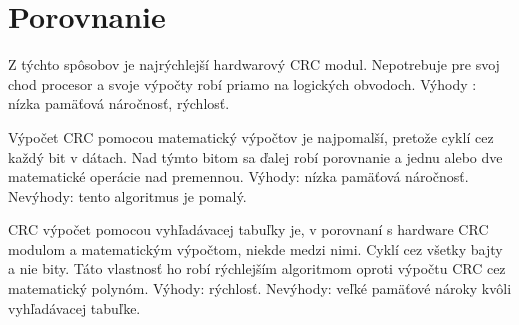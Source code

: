 \documentclass[a4paper, 11pt]{article}
\begin{document}
\section{Porovnanie}
Z týchto spôsobov je najrýchlejší hardwarový CRC modul. Nepotrebuje pre svoj chod procesor a svoje výpočty robí priamo na logických obvodoch. Výhody : nízka pamäťová náročnosť, rýchlosť.

Výpočet CRC pomocou matematický výpočtov je najpomalší, pretože cyklí cez každý bit v dátach. Nad týmto bitom sa ďalej robí porovnanie a jednu alebo dve matematické operácie nad premennou. Výhody: nízka pamäťová náročnosť. Nevýhody: tento algoritmus je pomalý.

CRC výpočet pomocou vyhľadávacej tabuľky je, v porovnaní s hardware CRC modulom a matematickým výpočtom, niekde medzi nimi. Cyklí cez všetky bajty a nie bity. Táto vlastnosť ho robí rýchlejším algoritmom oproti výpočtu CRC cez matematický polynóm. Výhody: rýchlosť. Nevýhody: veľké pamäťové nároky kvôli vyhľadávacej tabuľke.
\end{document}
